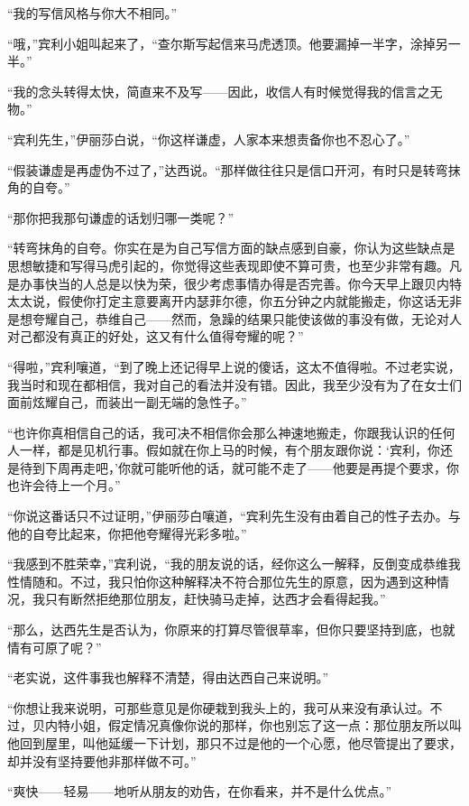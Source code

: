 \par “我的写信风格与你大不相同。”
\par “哦，”宾利小姐叫起来了，“查尔斯写起信来马虎透顶。他要漏掉一半字，涂掉另一半。”
\par “我的念头转得太快，简直来不及写——因此，收信人有时候觉得我的信言之无物。”
\par “宾利先生，”伊丽莎白说，“你这样谦虚，人家本来想责备你也不忍心了。”
\par “假装谦虚是再虚伪不过了，”达西说。“那样做往往只是信口开河，有时只是转弯抹角的自夸。”
\par “那你把我那句谦虚的话划归哪一类呢？”
\par “转弯抹角的自夸。你实在是为自己写信方面的缺点感到自豪，你认为这些缺点是思想敏捷和写得马虎引起的，你觉得这些表现即使不算可贵，也至少非常有趣。凡是办事快当的人总是以快为荣，很少考虑事情办得是否完善。你今天早上跟贝内特太太说，假使你打定主意要离开内瑟菲尔德，你五分钟之内就能搬走，你这话无非是想夸耀自己，恭维自己——然而，急躁的结果只能使该做的事没有做，无论对人对己都没有真正的好处，这又有什么值得夸耀的呢？”
\par “得啦，”宾利嚷道，“到了晚上还记得早上说的傻话，这太不值得啦。不过老实说，我当时和现在都相信，我对自己的看法并没有错。因此，我至少没有为了在女士们面前炫耀自己，而装出一副无端的急性子。”
\par “也许你真相信自己的话，我可决不相信你会那么神速地搬走，你跟我认识的任何人一样，都是见机行事。假如就在你上马的时候，有个朋友跟你说：‘宾利，你还是待到下周再走吧，’你就可能听他的话，就可能不走了——他要是再提个要求，你也许会待上一个月。”
\par “你说这番话只不过证明，”伊丽莎白嚷道，“宾利先生没有由着自己的性子去办。与他的自夸比起来，你把他夸耀得光彩多啦。”
\par “我感到不胜荣幸，”宾利说，“我的朋友说的话，经你这么一解释，反倒变成恭维我性情随和。不过，我只怕你这种解释决不符合那位先生的原意，因为遇到这种情况，我只有断然拒绝那位朋友，赶快骑马走掉，达西才会看得起我。”
\par “那么，达西先生是否认为，你原来的打算尽管很草率，但你只要坚持到底，也就情有可原了呢？”
\par “老实说，这件事我也解释不清楚，得由达西自己来说明。”
\par “你想让我来说明，可那些意见是你硬栽到我头上的，我可从来没有承认过。不过，贝内特小姐，假定情况真像你说的那样，你也别忘了这一点：那位朋友所以叫他回到屋里，叫他延缓一下计划，那只不过是他的一个心愿，他尽管提出了要求，却并没有坚持要他非那样做不可。”
\par “爽快——轻易——地听从朋友的劝告，在你看来，并不是什么优点。”
